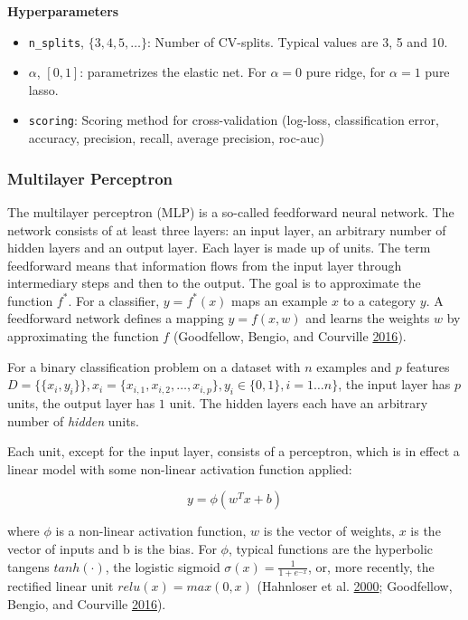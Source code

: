 \documentclass[
  11pt,
  a4paper,
  DIV=12,captions=tableheading,oneside,titlepage]{scrbook}
\providecommand{\tightlist}{%
  \setlength{\itemsep}{0pt}\setlength{\parskip}{0pt}}
\begin{document}
\textbf{Hyperparameters}

\begin{itemize}
\tightlist
\item
  \texttt{n\_splits}, \(\{3,4,5, \ldots\}\): Number of CV-splits. Typical values are 3, 5 and 10.
\item
  \(\alpha\), \([0, 1]\): parametrizes the elastic net. For \(\alpha = 0\) pure ridge, for \(\alpha = 1\) pure lasso.
\item
  \texttt{scoring}: Scoring method for cross-validation (log-loss, classification error, accuracy, precision, recall, average precision, roc-auc)
\end{itemize}

\hypertarget{multilayer-perceptron}{%
\subsubsection{Multilayer Perceptron}\label{multilayer-perceptron}}

The multilayer perceptron (MLP) is a so-called feedforward neural network. The network consists of at least three layers: an input layer, an arbitrary number of hidden layers and an output layer. Each layer is made up of units. The term feedforward means that information flows from the input layer through intermediary steps and then to the output. The goal is to approximate the function \(f^*\). For a classifier, \(y = f^*(x)\) maps an example \(x\) to a category \(y\). A feedforward network defines a mapping \(y=f(x, w)\) and learns the weights \(w\) by approximating the function \(f\) (Goodfellow, Bengio, and Courville \protect\hyperlink{ref-goodfellow2016deep}{2016}).

For a binary classification problem on a dataset with \(n\) examples and \(p\) features \(D = \{\{x_i, y_i\}\}, x_i = \{x_{i,1},x_{i,2},\ldots,x_{i,p}\}, y_i \in \{0,1\}, i = 1 \ldots n\}\), the input layer has \(p\) units, the output layer has \(1\) unit. The hidden layers each have an arbitrary number of \emph{hidden} units.

Each unit, except for the input layer, consists of a perceptron, which is in effect a linear model with some non-linear activation function applied:

\begin{equation}
y = \phi(w^Tx+b)
\label{eq:perceptron}
\end{equation}

where \(\phi\) is a non-linear activation function, \(w\) is the vector of weights, \(x\) is the vector of inputs and b is the bias. For \(\phi\), typical functions are the hyperbolic tangens \(tanh(\cdot)\), the logistic sigmoid \(\sigma(x) = \frac{1}{1+e^{-x}}\), or, more recently, the rectified linear unit \(relu(x) = max(0,x)\) (Hahnloser et al. \protect\hyperlink{ref-hahnloser2000digital}{2000}; Goodfellow, Bengio, and Courville \protect\hyperlink{ref-goodfellow2016deep}{2016}).
\end{document}
